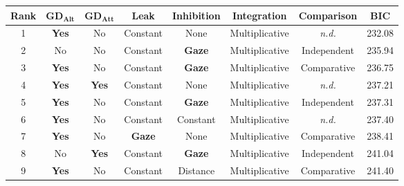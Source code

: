 \documentclass[11pt, a4paper]{article}
\begin{document}
\begin{refsection}
\begin{table}[!ht]
\begin{centering}
\begin{tabular}{@{}cccccccc@{}}
\toprule
\textbf{Rank} & $\mathbf{GD_{Alt}}$                 & $\mathbf{GD_{Att}}$                 & \textbf{Leak}                         & \textbf{Inhibition}                   & \textbf{Integration}    & \textbf{Comparison}    & \textbf{BIC}    \\ \midrule
1    & \cellcolor[HTML]{DAE8FC}\textbf{Yes} & No                          & Constant                     & None                         & Multiplicative & \textit{n.d.} & 232.08 \\
2    & No                          & No                          & Constant                     & \cellcolor[HTML]{DAE8FC}\textbf{Gaze} & Multiplicative & Independent   & 235.94 \\
3    & \cellcolor[HTML]{DAE8FC}\textbf{Yes} & No                          & Constant                     & \cellcolor[HTML]{DAE8FC}\textbf{Gaze}                         & Multiplicative & Comparative   & 236.75 \\
4    & \cellcolor[HTML]{DAE8FC}\textbf{Yes} & \cellcolor[HTML]{DAE8FC}\textbf{Yes} & Constant                     & None                         & Multiplicative & \textit{n.d.} & 237.21 \\
5    & \cellcolor[HTML]{DAE8FC}\textbf{Yes} & No                          & Constant                     & \cellcolor[HTML]{DAE8FC}\textbf{Gaze} & Multiplicative & Independent   & 237.31 \\
6    & \cellcolor[HTML]{DAE8FC}\textbf{Yes} & No                          & Constant                     & Constant                     & Multiplicative & \textit{n.d.} & 237.40 \\
7    & \cellcolor[HTML]{DAE8FC}\textbf{Yes} & No                          & \cellcolor[HTML]{DAE8FC}\textbf{Gaze} & None                         & Multiplicative & Comparative   & 238.41 \\
8    & No                          & \cellcolor[HTML]{DAE8FC}\textbf{Yes} & Constant                     & \cellcolor[HTML]{DAE8FC}\textbf{Gaze} & Multiplicative & Independent   & 241.04 \\
9    & \cellcolor[HTML]{DAE8FC}\textbf{Yes} & No                          & Constant                     & Distance                     & Multiplicative & Comparative   & 241.40 \\

\end{tabular}
\end{centering}
\end{table}
\end{refsection}
\end{document}
